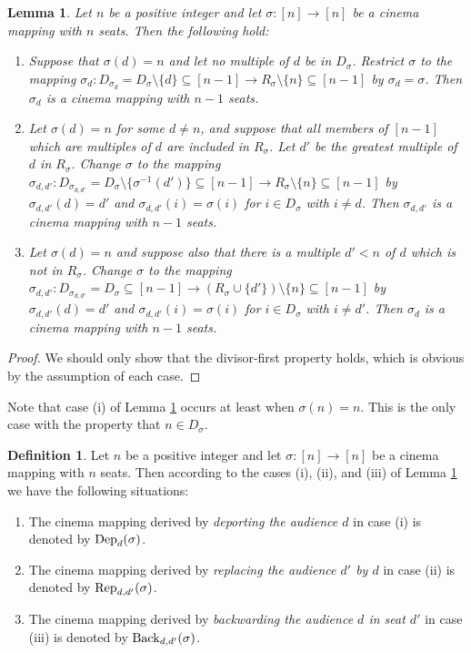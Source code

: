 \documentclass{amsart}
\newtheorem{lemma}[theorem]{Lemma}
\theoremstyle{definition}
\newtheorem{definition}[theorem]{Definition}
\begin{document}
\begin{lemma}\label{restrict}
Let $n$ be a positive integer and let $\sigma:[n]\to[n]$ be a cinema mapping with $n$ seats. Then the following hold:
\begin{enumerate}
\item[i.] Suppose that $\sigma(d)=n$ and let no multiple of $d$ be in $D_\sigma$. Restrict $\sigma$ to the mapping $\sigma_d:D_{\sigma_d}=D_\sigma\setminus\{d\}\subseteq[n-1]\to R_\sigma\setminus\{n\}\subseteq[n-1]$ by $\sigma_d=\sigma$. Then $\sigma_d$ is a cinema mapping with $n-1$ seats.
\item[ii.] Let $\sigma(d) = n$ for some $d\neq n$, and suppose that all members of $[n-1]$ which are multiples of $d$ are included in $R_\sigma$. Let $d'$ be the greatest multiple of $d$ in $R_\sigma$. Change $\sigma$ to the mapping $\sigma_{d,d'}:D_{\sigma_{d,d'}}=D_\sigma\setminus\{\sigma^{-1}(d')\} \subseteq[n-1]\to R_\sigma\setminus\{n\}\subseteq[n-1]$ by $\sigma_{d,d'}(d)=d'$ and $\sigma_{d,d'}(i)=\sigma(i)$ for $i\in D_\sigma$ with $i\neq d$. Then $\sigma_{d,d'}$ is a cinema mapping with $n-1$ seats. 
\item[iii.] Let $\sigma(d)=n$ and suppose also that there is a multiple $d'<n$ of $d$ which is not in $R_\sigma$. Change $\sigma$ to the mapping $\sigma_{d,d'}:D_{\sigma_{d,d'}}=D_\sigma \subseteq[n-1]\to (R_\sigma\cup\{d'\})\setminus\{n\}\subseteq[n-1]$ by $\sigma_{d,d'}(d)=d'$ and $\sigma_{d,d'}(i)=\sigma(i)$ for $i\in D_\sigma$ with $i\neq d'$. Then $\sigma_d$ is a cinema mapping with $n-1$ seats. 
\end{enumerate}
\end{lemma}

\begin{proof}
We should only show that the divisor-first property holds, which is obvious by the assumption of each case. 
\end{proof}

Note that case (i) of Lemma \ref{restrict} occurs at least when $\sigma(n)=n$. This is the only case with the property that $n\in D_\sigma$.

\begin{definition}
Let $n$ be a positive integer and let $\sigma:[n]\to[n]$ be a cinema mapping with $n$ seats. Then according to the cases (i), (ii), and (iii) of Lemma \ref{restrict} we have the following situations:
\begin{enumerate}
\item[i.] The cinema mapping derived by \textit{deporting the audience $d$} in case (i) is denoted by ${\rm Dep}_d(\sigma)$. 
\item[ii.] The cinema mapping derived by \textit{replacing the audience $d'$ by $d$} in case (ii) is denoted by ${\rm Rep}_{d,d'}(\sigma)$. 
\item[iii.] The cinema mapping derived by \textit{backwarding the audience $d$ in seat $d'$} in case (iii) is denoted by ${\rm Back}_{d,d'}(\sigma)$. 
\end{enumerate}
\end{definition}
\end{document}
